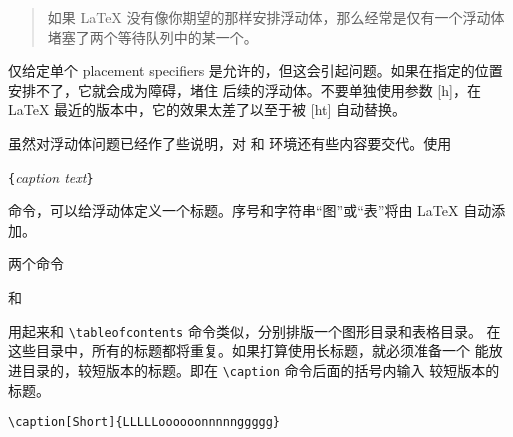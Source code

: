 \begin{quote}
如果 \LaTeX{} 没有像你期望的那样安排浮动体，那么经常是仅有一个浮动体
堵塞了两个等待队列中的某一个。
\end{quote}

仅给定单个 placement
specifiers 是允许的，但这会引起问题。如果在指定的位置安排不了，它就会成为障碍，堵住
后续的浮动体。不要单独使用参数 [h]，在 \LaTeX{} 最近的版本中，它的效果太差了以至于被 [ht] 
自动替换。

\bigskip
虽然对浮动体问题已经作了些说明，对  和  环境还有些内容要交代。使用

\begin{lscommand}
\verb|{|\emph{caption text}\verb|}|
\end{lscommand}

\noindent
命令，可以给浮动体定义一个标题。序号和字符串“图”或“表”将由 \LaTeX{} 自动添加。

两个命令

\begin{lscommand}
 和 
\end{lscommand}

\noindent
用起来和 \verb|\tableofcontents| 命令类似，分别排版一个图形目录和表格目录。
在这些目录中，所有的标题都将重复。如果打算使用长标题，就必须准备一个
能放进目录的，较短版本的标题。即在 \verb|\caption| 命令后面的括号内输入
较短版本的标题。
\begin{code}
\verb|\caption[Short]{LLLLLoooooonnnnnggggg}|
\end{code}

